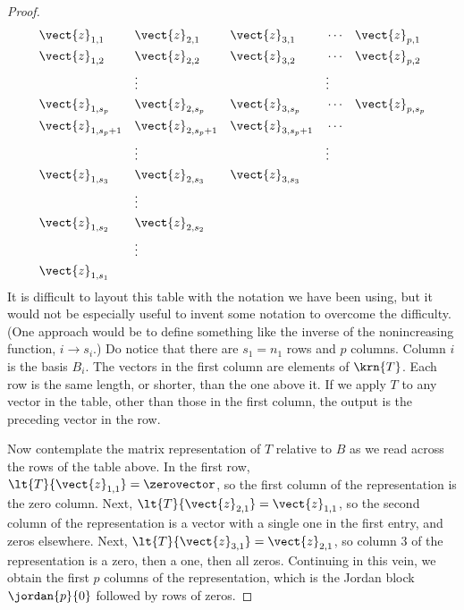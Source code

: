 \begin{proof}
%
\begin{align*}
&\vect{z}_{1,1}&&\vect{z}_{2,1}&&\vect{z}_{3,1}&&\cdots&&\vect{z}_{p,1}\\
&\vect{z}_{1,2}&&\vect{z}_{2,2}&&\vect{z}_{3,2}&&\cdots&&\vect{z}_{p,2}\\
&                       &&\vdots              &&                       &&\vdots&&\\
&\vect{z}_{1,s_p}&&\vect{z}_{2,s_p}&&\vect{z}_{3,s_p}&&\cdots&&\vect{z}_{p,s_p}\\
&\vect{z}_{1,s_p+1}&&\vect{z}_{2,s_p+1}&&\vect{z}_{3,s_p+1}&&\cdots&&\\
&                       &&\vdots              &&                       &&\vdots&&\\
&\vect{z}_{1,s_3}&&\vect{z}_{2,s_3}&&\vect{z}_{3,s_3}&&&&\\
&                          &&\vdots&&&&&&\\
&\vect{z}_{1,s_2}&&\vect{z}_{2,s_2}&&&&&&\\
&                          &&\vdots&&&&&&\\
&\vect{z}_{1,s_1}&&&&&&&&\\
\end{align*}
%
It is difficult to layout this table with the notation we have been using, but it would not be especially useful to invent some notation to overcome the difficulty. (One approach would be to define something like the inverse of the nonincreasing function, $i\rightarrow s_i$.)  Do notice that there are $s_1=n_1$ rows and $p$ columns.  Column $i$ is the basis $B_i$.  The vectors in the first column are elements of $\krn{T}$.  Each row is the same length, or shorter, than the one above it.  If we apply $T$ to any vector in the table, other than those in the first column, the output is the preceding vector in the row.\par
%
Now contemplate the matrix representation of $T$ relative to $B$ as we read across the rows of the table above.  In the first row, $\lt{T}{\vect{z}_{1,1}}=\zerovector$, so the first column of the representation is the zero column.  Next, $\lt{T}{\vect{z}_{2,1}}=\vect{z}_{1,1}$, so the second column of the representation is a vector with a single one in the first entry, and zeros elsewhere.  Next, $\lt{T}{\vect{z}_{3,1}}=\vect{z}_{2,1}$, so column 3 of the representation is a zero, then a one, then all zeros.  Continuing in this vein, we obtain the first $p$ columns of the representation, which is the Jordan block $\jordan{p}{0}$ followed by rows of zeros.\par

\end{proof}
